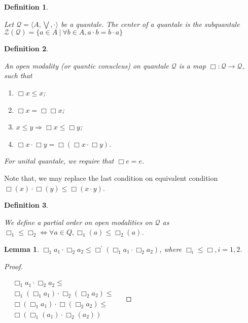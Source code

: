 \documentclass[a4paper]{article}
\theoremstyle{defin}
\newtheorem{defin}{Definition}
\theoremstyle{theorem}
\theoremstyle{prop}
\theoremstyle{lemma}
\newtheorem{lemma}{Lemma}
\theoremstyle{ex}
\theoremstyle{col}
\begin{document}
\begin{defin}
$ $

  Let $\mathcal{Q} = \langle A, \bigvee, \cdot \rangle$ be a quantale.
  The center of a quantale is the subquantale $\mathcal{Z}(\mathcal{Q}) = \{ a \in A \: | \: \forall b \in A, a \cdot b = b \cdot a \}$
\end{defin}

\begin{defin}
$ $

  An open modality (or quantic conucleus) on quantale $\mathcal{Q}$ is a map $\Box : \mathcal{Q} \to \mathcal{Q}$, such that

\begin{enumerate}
  \item $\Box x \leq x$;
  \item $\Box x = \Box \Box x$;
  \item $x \leq y \Rightarrow \Box x \leq \Box y$;
  \item $\Box x \cdot \Box y = \Box (\Box x \cdot \Box y)$.
\end{enumerate}

For unital quantale, we require that $\Box e = e$.
\end{defin}

Note that, we may replace the last condition on equivalent condition $\Box (x) \cdot \Box (y) \leq \Box (x \cdot y)$.

\begin{defin}
$ $

  We define a partial order on open modalities on $\mathcal{Q}$ as $\Box_1 \leq \Box_2 \Leftrightarrow \forall a \in Q, \Box_1 (a) \leq \Box_2 (a)$.
\end{defin}

\begin{lemma}
  $\Box_1 a_1 \cdot \Box_2 a_2 \leq \Box^{'} (\Box_1 a_1 \cdot \Box_2 a_2)$, where $\Box_i \leq \Box, i = 1,2$.
\end{lemma}

\begin{proof}
$ $

  $\begin{array}{lll}
  &\Box_1 a_1 \cdot \Box_2 a_2 \leq & \\
  &\Box_1 (\Box_1 a_1) \cdot \Box_2 (\Box_2 a_2) \leq & \\
  &\Box (\Box_1 a_1) \cdot \Box (\Box_2 a_2) \leq & \\
  &\Box (\Box_1 (a_1) \cdot \Box_2 (a_2))&
  \end{array}$
\end{proof}
\end{document}
